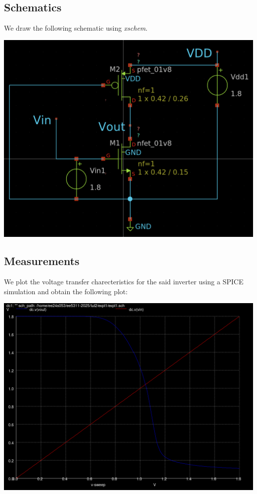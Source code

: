 \documentclass[10pt,a4paper]{article}
\begin{document}
\subsection{Schematics}
\noindent We draw the following schematic using \emph{xschem}.
\newline
\begin{center}
\includegraphics[scale=0.4]{tut2/reports/media/expt1.sch.png}
\end{center}


\subsection{Measurements}

\noindent We plot the voltage transfer charecteristics for the said inverter using a SPICE simulation and obtain the following plot:

\begin{center}
\includegraphics[scale=0.3]{tut2/reports/media/expt1_vtc.png}
\end{center}
\end{document}
